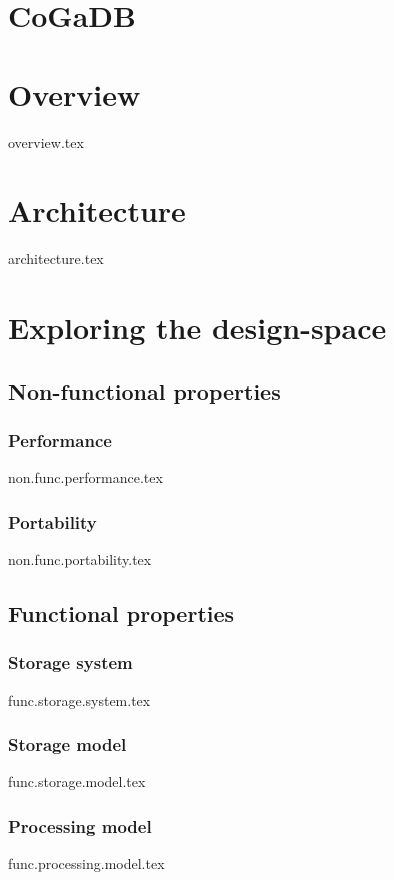 \documentclass[a4paper, 11pt]{article}
\begin{document}
\section*{CoGaDB}
\section*{Overview}
{overview.tex}

\section*{Architecture}
{architecture.tex}

\section*{Exploring the design-space}
\subsection*{Non-functional properties}
\subsubsection*{Performance}
{non.func.performance.tex}

\subsubsection*{Portability}
{non.func.portability.tex}

\subsection*{Functional properties}
\subsubsection*{Storage system}
{func.storage.system.tex}

\subsubsection*{Storage model}
{func.storage.model.tex}

\subsubsection*{Processing model}
{func.processing.model.tex}
\end{document}
